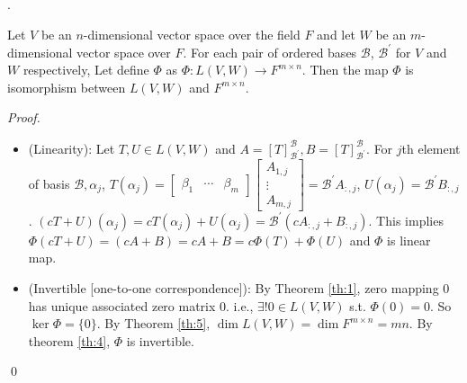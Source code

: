 \documentclass[8pt]{beamer}
\newcommand{\mc}[1]{\mathcal{#1}}
\newcommand{\ti}[1]{\textit{#1}}
\begin{document}
\begin{frame}{.}
    \begin{theorem}
        Let $V$ be an $n$-dimensional vector space over the field $F$ and let $W$ be an $m$-dimensional vector space over $F$.
        For each pair of ordered bases $\mc{B}$, $\mc{B}^\prime$ for $V$ and $W$ respectively,
        Let define $\Phi$ as $\Phi : L(V,W) \to F^{m \times n}$.
        Then the map $\Phi$ is isomorphism between $L(V,W)$ and $F^{m \times n}$.
    \end{theorem}

    \ti{Proof.}
    \begin{itemize}
        \item (Linearity): Let $T, U \in L(V,W)$ and $A = [T]^{\mc{B}}_{\mc{B}^\prime}, B = [T]^{\mc{B}}_{\mc{B}^\prime}$.
        For $j$th element of basis $\mc{B}, \alpha_j$, $T(\alpha_j) = \left[\begin{matrix}
            \beta_1 & \cdots & \beta_m
        \end{matrix}\right] \left[\begin{matrix}
            A_{1,j} \\ \vdots \\ A_{m,j}
        \end{matrix}\right] = \mc{B}^\prime A_{:,j}$, $U(\alpha_j) = \mc{B}^\prime B_{:,j}$.
        $(cT + U)(\alpha_j) = cT(\alpha_j) + U(\alpha_j) = \mc{B}^\prime (cA_{:,j} + B_{:,j})$.
        This implies $\Phi(cT + U) = (cA + B) = cA + B = c\Phi(T) + \Phi(U)$ and $\Phi$ is linear map.
        \item (Invertible [one-to-one correspondence]): By Theorem \ref{th:1}, zero mapping $0$ has unique associated zero matrix $0$. i.e., $\exists! 0 \in L(V,W)$ s.t. $\Phi(0) = 0$. So $\ker \Phi = \{0\}$.
        By Theorem \ref{th:5}, $\dim L(V,W) = \dim F^{m \times n} = mn$.
        By theorem \ref{th:4}, $\Phi$ is invertible.
    \end{itemize}
    \qed
\end{frame}
\end{document}
